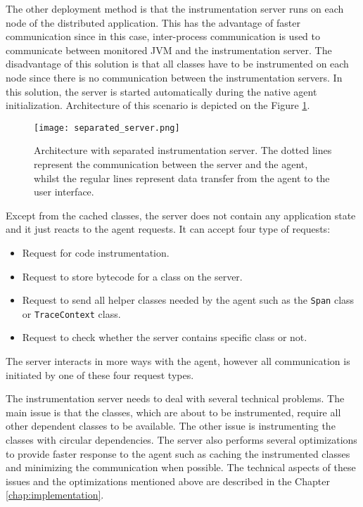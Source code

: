  The other deployment method is that the instrumentation server runs on each node of the distributed application. This has the advantage of faster communication since in this case, inter-process communication is used to communicate between monitored JVM and the instrumentation server. The disadvantage of this solution is that all classes have to be instrumented on each node since there is no communication between the instrumentation servers. In this solution, the server is started automatically during the native agent initialization. Architecture of this scenario is depicted on the Figure \ref{fig:separated_server}.
 
 \begin{figure}
 	\centering
 	\texttt{[image: separated\_server.png]}
 	\caption{Architecture with separated instrumentation server. The dotted lines represent the communication between the server and the agent, whilst the regular lines represent data transfer from the agent to the user interface.}
 	\label{fig:separated_server}
 \end{figure}

Except from the cached classes, the server does not contain any application state and it just reacts to the agent requests. It can accept four type of requests:
\begin{itemize}
	\item Request for code instrumentation.
	\item Request to store bytecode for a class on the server.
	\item Request to send all helper classes needed by the agent such as the \texttt{Span} class or \texttt{TraceContext} class.
	\item Request to check whether the server contains specific class or not.
\end{itemize}
The server interacts in more ways with the agent, however all communication is initiated by one of these four request types.	

The instrumentation server needs to deal with several technical problems. The main issue is that the classes, which are about to be instrumented, require all other dependent classes to be available. The other issue is instrumenting the classes with circular dependencies. The server also performs several optimizations to provide faster response to the agent such as caching the instrumented classes and minimizing the communication when possible. The technical aspects of these issues and the optimizations mentioned above are described in the Chapter \ref{chap:implementation}.
